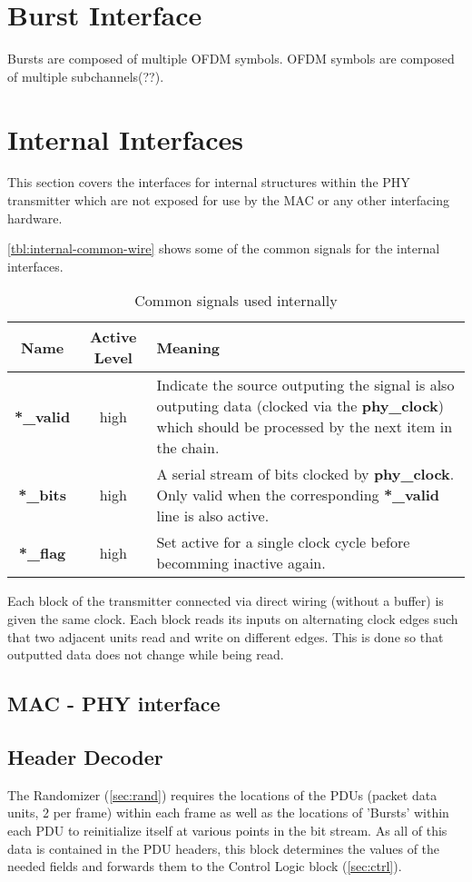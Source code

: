 \documentclass[dvips,10pt,twocolumn]{article}
\begin{document}
\section{Burst Interface}
\label{sec:burst}

Bursts are composed of multiple OFDM symbols. OFDM symbols are composed of
multiple subchannels(??).

	
\section{Internal Interfaces}
This section covers the interfaces for internal structures within the PHY
transmitter which are not exposed for use by the MAC or any other interfacing
hardware.

\autoref{tbl:internal-common-wire} shows some of the common signals for
the internal interfaces.

\begin{table*}
\begin{tabulary}{\textwidth}{c|C|L}
	\label{tbl:internal-common-wire}
	Name & Active Level & Meaning \\ \hline
	
	\textbf{*\_valid} & high & Indicate the source outputing the signal
	is also outputing data (clocked via the \textbf{phy\_clock}) which
	should be processed by the next item in the chain. \\

	\textbf{*\_bits} & high & A serial stream of bits clocked by
	\textbf{phy\_clock}. Only valid when the corresponding
	\textbf{*\_valid} line is also active. \\

	\textbf{*\_flag} & high & Set active for a single clock cycle
	before becomming inactive again.
\end{tabulary}
\caption{Common signals used internally}
\end{table*}

Each block of the transmitter connected via direct wiring (without a
buffer) is given the same clock. Each block reads its inputs on alternating
clock edges such that two adjacent units read and write on different edges.
This is done so that outputted data does not change while being read.

	\subsection{MAC - PHY interface}
	\label{sec:mac_phy}


	\subsection{Header Decoder}
	\label{sec:header}
	The Randomizer (\autoref{sec:rand}) requires the locations of the
	PDUs (packet data units, 2 per frame) within each frame as well as
	the locations of 'Bursts' within each PDU to reinitialize itself at
	various points in the bit stream. As all of this data is contained
	in the PDU headers, this block determines the values of the needed
	fields and forwards them to the Control Logic block
	(\autoref{sec:ctrl}). 
\end{document}
